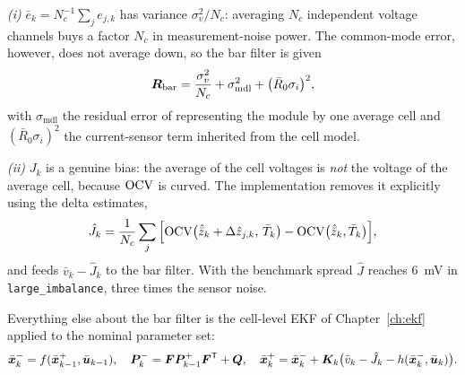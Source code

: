 \emph{(i)} $\bar e_k = N_c^{-1}\sum_j e_{j,k}$ has variance $\sigma_v^2/N_c$: averaging $N_c$
independent voltage channels buys a factor $N_c$ in measurement-noise power. The common-mode
error, however, does not average down, so the bar filter is given
\begin{equation}
\bm{R}_{\text{bar}} = \frac{\sigma_v^2}{N_c} + \sigma_{\text{mdl}}^2 + \big(\bar R_0\sigma_i\big)^2,
\label{eq:bd-Rbar}
\end{equation}
with $\sigma_{\text{mdl}}$ the residual error of representing the module by one average cell and
$(\bar R_0 \sigma_i)^2$ the current-sensor term inherited from the cell model.

\emph{(ii)} $J_k$ is a genuine bias: the average of the cell voltages is \emph{not} the voltage
of the average cell, because $\mathrm{OCV}$ is curved. The implementation removes it explicitly using the
delta estimates,
\begin{equation}
\hat J_k = \frac{1}{N_c}\sum_j\Big[\mathrm{OCV}\big(\hat{\bar{z}}_k + \Delta\hat{z}_{j,k},\,\bar T_k\big) - \mathrm{OCV}\big(\hat{\bar{z}}_k,\bar T_k\big)\Big],
\label{eq:bd-jensen}
\end{equation}
and feeds $\bar v_k - \hat J_k$ to the bar filter. With the benchmark spread $\hat J$ reaches
\SI{6}{\milli\volt} in \texttt{large\_imbalance}, three times the sensor noise.

Everything else about the bar filter is the cell-level EKF of Chapter~\ref{ch:ekf} applied to the
nominal parameter set:
\begin{equation}
\bar{\bm{x}}^-_k = f(\bar{\bm{x}}^+_{k-1},\bar{\bm{u}}_{k-1}),\quad
\bm{P}^{-}_k = \bm{F}\bm{P}^{+}_{k-1}\bm{F}^{\mathsf{T}} + \bm{Q}, \quad
\bar{\bm{x}}^+_k = \bar{\bm{x}}^-_k + \bm{K}_k\big(\bar v_k - \hat J_k - h(\bar{\bm{x}}^-_k,\bar{\bm{u}}_k)\big).
\label{eq:bd-barekf}
\end{equation}

